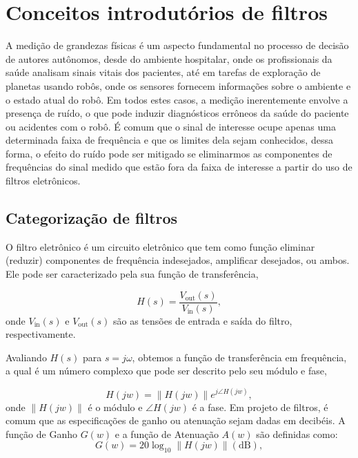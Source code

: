 
\chapter{Conceitos introdutórios de filtros}
\label{chap: introducao_filtros}

A medição de grandezas físicas é um aspecto fundamental no processo de decisão de autores autônomos, desde do ambiente hospitalar, onde os profissionais da saúde analisam sinais vitais dos pacientes, até em tarefas de exploração de planetas usando robôs, onde os sensores fornecem informações sobre o ambiente e o estado atual do robô. Em todos estes casos, a medição inerentemente envolve a presença de ruído, o que pode induzir diagnósticos errôneos da saúde do paciente ou acidentes com o robô. É comum que o sinal de interesse ocupe apenas uma determinada faixa de frequência e que os limites dela sejam conhecidos, dessa forma, o efeito do ruído pode ser mitigado se eliminarmos as componentes de frequências do sinal medido que estão fora da faixa de interesse a partir do uso de filtros eletrônicos.

\section{Categorização de filtros}

O filtro eletrônico é um circuito eletrônico que tem como função eliminar (reduzir) componentes de frequência indesejados, amplificar desejados, ou ambos. Ele pode ser caracterizado pela sua função de transferência,

\begin{equation}
    H(s) = \frac{V_{\text{out}}(s)}{V_{\text{in}}(s)},
\end{equation}
onde $V_{\text{in}}(s)$ e $V_{\text{out}}(s)$ são as tensões de entrada e saída do filtro, respectivamente.  

Avaliando $H(s)$ para $s = j\omega$, obtemos a função de transferência em frequência, a qual é um número complexo que pode ser descrito pelo seu módulo e fase,

\begin{equation}
    H(jw) = \| H(jw) \| e^{j\angle H(jw)},
\end{equation}
onde $\| H(jw) \|$ é o módulo e $\angle H(jw)$ é a fase. Em projeto de filtros, é comum que as especificações de ganho ou atenuação sejam dadas em decibéis. A função de Ganho $G(w)$ e a função de Atenuação $A(w)$ são definidas como:
\begin{equation}
    G(w) = 20 \log_{10} \| H(jw) \| (\text{dB}),
\end{equation}


